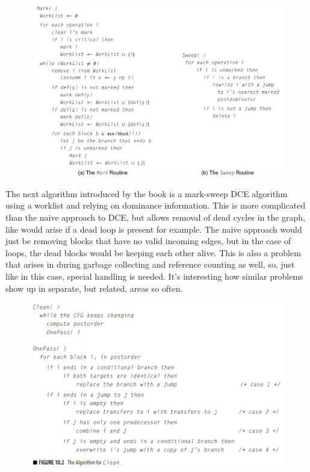 \documentclass[11pt, a4paper, titlepage]{article}
\begin{document}
\begin{figure}[H]
  \centering
  \includegraphics[scale=0.3]{images/r3.png}
\end{figure}

The next algorithm introduced by the book is a mark-sweep DCE algorithm using a worklist and relying on dominance information. This is more complicated than the naive approach to DCE, but allows removal of dead cycles in the graph, like would arise if a dead loop is present for example. The naive approach would just be removing blocks that have no valid incoming edges, but in the case of loops, the dead blocks would be keeping each other alive. This is also a problem that arises in during garbage collecting and reference counting as well, so, just like in this case, special handling is needed. It's interesting how similar problems show up in separate, but related, areas so often.

\begin{figure}[H]
  \centering
  \includegraphics[scale=0.3]{images/r4.png}
\end{figure}
\end{document}
